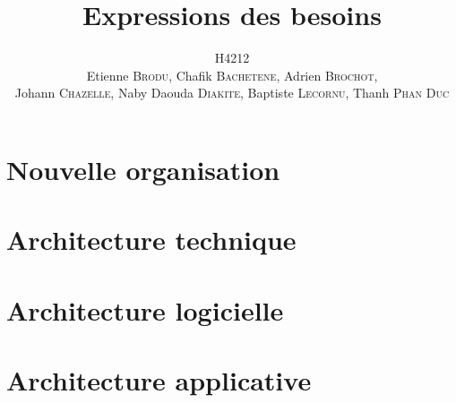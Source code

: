 \documentclass[a4paper,11pt]{article}
\title{Expressions des besoins}
\author{H4212\\Etienne \textsc{Brodu}, Chafik \textsc{Bachetene}, Adrien \textsc{Brochot},\\Johann \textsc{Chazelle}, Naby Daouda \textsc{Diakite}, Baptiste \textsc{Lecornu}, Thanh \textsc{Phan Duc}}
\begin{document}
\maketitle
\newpage

\tableofcontents
\newpage

\part{Nouvelle organisation}
    
    
\part{Architecture technique}
	

\part{Architecture logicielle}
    

\part{Architecture applicative}
    
\end{document}
